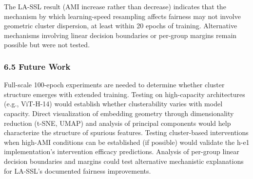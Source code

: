 The LA-SSL result (AMI increase rather than decrease) indicates that the mechanism by which learning-speed resampling affects fairness may not involve geometric cluster dispersion, at least within 20 epochs of training. Alternative mechanisms involving linear decision boundaries or per-group margins remain possible but were not tested.

\subsubsection{6.5 Future Work}

Full-scale 100-epoch experiments are needed to determine whether cluster structure emerges with extended training. Testing on high-capacity architectures (e.g., ViT-H-14) would establish whether clusterability varies with model capacity. Direct visualization of embedding geometry through dimensionality reduction (t-SNE, UMAP) and analysis of principal components would help characterize the structure of spurious features. Testing cluster-based interventions when high-AMI conditions can be established (if possible) would validate the h-e1 implementation's intervention efficacy predictions. Analysis of per-group linear decision boundaries and margins could test alternative mechanistic explanations for LA-SSL's documented fairness improvements.
